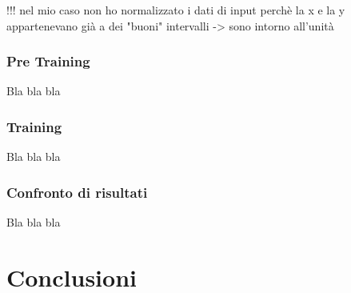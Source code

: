 \documentclass[12pt,a4paper,final]{book}
\begin{document}
!!! nel mio caso non ho normalizzato i dati di input perchè la x e la y appartenevano già a dei "buoni" intervalli -> sono intorno all'unità


\subsection{Pre Training}\label{pre_training}
Bla bla bla 


\subsection{Training}\label{training}
Bla bla bla 


\subsection{Confronto di risultati}\label{risultati}
Bla bla bla 









\chapter{Conclusioni}\label{conclusioni}



{}

\end{document}
